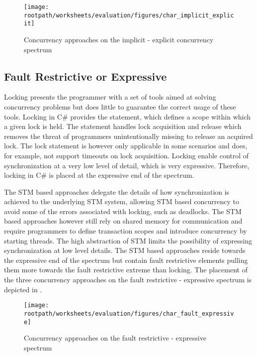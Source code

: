 \begin{figure}[htbp]
\centering
 \texttt{[image: \\rootpath/worksheets/evaluation/figures/char\_implicit\_explicit]} 
 \caption{Concurrency approaches on the implicit - explicit concurrency spectrum}
\label{fig:char_implicit_explicit}
\end{figure}

\subsection{Fault Restrictive or Expressive}
Locking presents the programmer with a set of tools aimed at solving concurrency problems but does little to guarantee the correct usage of these tools. Locking in C\# provides the  statement\cite[p. 102]{csharp2013specificaiton}, which defines a scope within which a given lock is held. The  statement handles lock acquisition and release which removes the threat of programmers unintentionally missing to release an acquired lock. The lock statement is however only applicable in some scenarios and does, for example, not support timeouts on lock acquisition. Locking enable control of synchronization at a very low level of detail, which is very expressive. Therefore, locking in C\# is placed at the expressive end of the spectrum.

The \ac{STM} based approaches delegate the details of how synchronization is achieved to the underlying \ac{STM} system, allowing \ac{STM} based concurrency to avoid some of the errors associated with locking, such as deadlocks. The \ac{STM} based approaches however still rely on shared memory for communication and require programmers to define transaction scopes and introduce concurrency by starting threads. The high abstraction of \ac{STM} limits the possibility of expressing synchronization at low level details. The \ac{STM} based approaches reside towards the expressive end of the spectrum but contain fault restrictive elements pulling them more towards the fault restrictive extreme than locking. The placement of the three concurrency approaches on the fault restrictive - expressive spectrum is depicted in .
\begin{figure}[htbp]
\centering
 \texttt{[image: \\rootpath/worksheets/evaluation/figures/char\_fault\_expressive]} 
 \caption{Concurrency approaches on the fault restrictive - expressive spectrum}
\label{fig:char_fault_expressive}
\end{figure}

